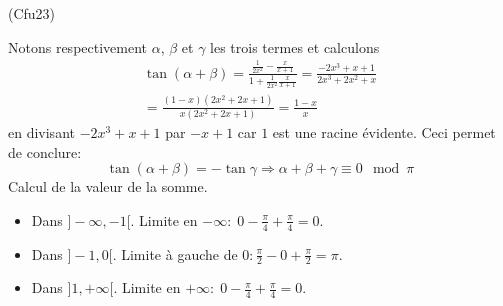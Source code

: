 \begin{tiny}(Cfu23)\end{tiny} Notons respectivement $\alpha$, $\beta$ et $\gamma$ les trois termes et calculons
\begin{multline*}
  \tan(\alpha + \beta) =
\frac{\frac{1}{2x^2} - \frac{x}{x+1}}{1+\frac{1}{2x^2}\frac{x}{x+1}}
= \frac{-2x^3 + x +1}{2x^3 + 2x^2 +x} \\
= \frac{(1-x)(2x^2+2x+1)}{x(2x^2+2x+1)}= \frac{1-x}{x}
\end{multline*}
en divisant $-2x^3 + x +1$ par $-x+1$ car $1$ est une racine évidente. Ceci permet de conclure:
\begin{displaymath}
\tan(\alpha + \beta) = - \tan \gamma \Rightarrow \alpha + \beta + \gamma \equiv 0 \mod \pi  
\end{displaymath}
Calcul de la valeur de la somme.
\begin{itemize}
  \item Dans $]-\infty, -1[$. Limite en $-\infty : \; 0 - \frac{\pi}{4} + \frac{\pi}{4} = 0$.
  \item Dans $]-1,0[$. Limite à gauche de $0 : \frac{\pi}{2} -0 + \frac{\pi}{2} = \pi$. 
  \item Dans $]1, +\infty[$. Limite en $+\infty : \; 0 - \frac{\pi}{4} + \frac{\pi}{4} = 0$.
\end{itemize}

